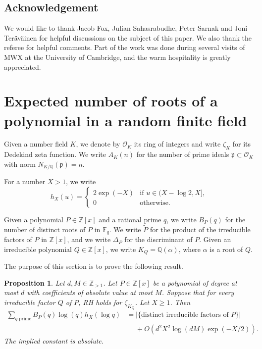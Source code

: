 \documentclass[12pt, notitlepage]{amsart}
\numberwithin{equation}{section}
\def\Q{\mathbb Q}
\def\Z{\mathbb Z}
\def\F{\mathbb F}
\def\wt{\widetilde}
\newcommand{\cO}{\mathcal{O}}
\newtheorem{proposition}[theorem]{Proposition}
\theoremstyle{remark}
\theoremstyle{definition}
\theoremstyle{remark}
\numberwithin{equation}{section}
\renewcommand{\a}{\alpha}
\begin{document}
\subsection{Acknowledgement}
We would like to thank Jacob Fox, Julian Sahasrabudhe, Peter Sarnak and Joni Ter\"av\"ainen for helpful discussions on the subject of this paper. We also thank the referee for helpful comments. Part of the work was done during several visits of MWX at the University of Cambridge, and the warm hospitality is greatly appreciated.




\section{Expected number of roots of a polynomial in a random finite field}
\label{sc:PIT}

Given a number field $K$, we denote by $\cO_K$ its ring of integers and
write $\zeta_K$ for its Dedekind zeta function.
We write $A_K(n)$ for the number of prime ideals $\mathfrak{p}\subset\cO_K$
with norm $N_{K/\Q}(\mathfrak{p})=n$.

For a number $X>1$, we write
\[
h_X(u)=
\begin{cases}
2\exp(-X) & \text{if $u\in(X-\log 2,X]$,}\\
0 &\text{otherwise}.
\end{cases}
\]

Given a polynomial $P\in\Z[x]$ and a rational prime $q$,
we write $B_P(q)$ for the number of distinct roots of $P$
in $\F_q$.
We write $\wt P$ for the product of the irreducible factors
of $P$ in $\Z[x]$, and we write $\Delta_P$ for the discriminant of $P$.
Given an irreducible polynomial $Q\in\Z[x]$, we write $K_Q=\Q(\a)$,
where $\a$ is a root of $Q$.

The purpose of this section is to prove the following result.

\begin{proposition}\label{pr:number-distinct-factors}
Let $d, M\in\Z_{> 1}$.
Let $P\in\Z[x]$ be a polynomial of degree at most $d$
with coefficients of absolute value at most $M$.
Suppose that for every irreducible factor $Q$ of $P$,
RH holds for $\zeta_{K_Q}$.
Let $X\ge 1$.
Then
\begin{align*}
\sum_{\text{$q$ prime}} B_P(q)\log(q)h_X(\log q)
&=|\{\text{distinct irreducible factors of $P$}\}|\\
&\phantom{=}+ O(d^2 X^2\log (dM)\exp(-X/2)).
\end{align*}
The implied constant is absolute.
\end{proposition}
\end{document}
